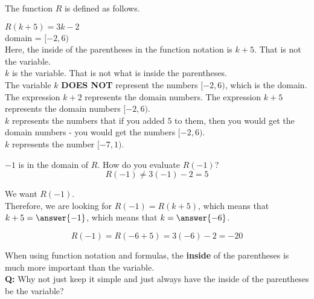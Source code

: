 \documentclass{ximera}
\begin{document}
\begin{example}

The function $R$ is defined as follows.

$R(k + 5) = 3k - 2$ \\
domain = $[-2, 6)$ \\


Here, the inside of the parentheses in the function notation is $k + 5$.  That is not the variable. \\


$k$ is the variable.  That is not what is inside the parentheses.\\


The variable $k$ \textbf{DOES NOT} represent the numbers $[-2, 6)$, which is the domain. \\


The expression $k + 2$ represents the domain numbers.   The expression $k + 5$ represents the domain numbers $[-2, 6)$. \\


$k$ represents the numbers that if you added $5$ to them, then you would get the domain numbers - you would get the numbers $[-2, 6)$.\\


$k$ represents the number $[-7, 1)$.



\begin{question}


$-1$ is in the domain of $R$. How do you evaluate $R(-1)$? \\

\[
R(-1) \ne 3 (-1) - 2 = 5
\]



We want $R(-1)$. \\

Therefore, we are looking for $R(-1) = R(k + 5)$, which means that $k + 5 = \answer{-1}$, which means that $k = \answer{-6}$.


\[
R(-1) = R(-6 + 5) = 3(-6) - 2 = -20
\]



\end{question}

\end{example}

When using function notation and formulas, the \textbf{inside} of the parentheses is much more important than the variable. \\



\textbf{Q:} Why not just keep it simple and just always have the inside of the parentheses be the variable? \\
\end{document}
